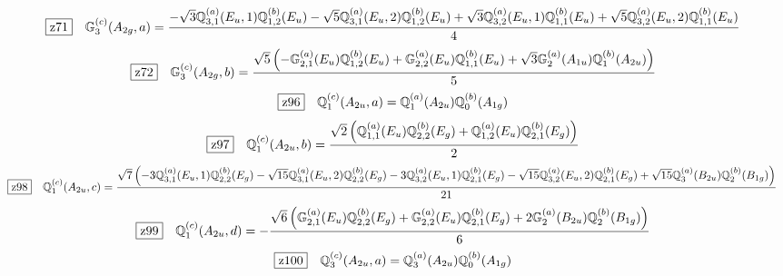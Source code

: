 \documentclass[fleqn,10pt,landscape]{jsarticle}
\begin{document}
\begin{dmath*}
\hspace*{3mm}\fbox{z71}\quad \mathbb{G}_{3}^{(c)}(A_{2g},a)=\frac{- \sqrt{3} \mathbb{Q}_{3,1}^{(a)}(E_{u},1) \mathbb{Q}_{1,2}^{(b)}(E_{u}) - \sqrt{5} \mathbb{Q}_{3,1}^{(a)}(E_{u},2) \mathbb{Q}_{1,2}^{(b)}(E_{u}) + \sqrt{3} \mathbb{Q}_{3,2}^{(a)}(E_{u},1) \mathbb{Q}_{1,1}^{(b)}(E_{u}) + \sqrt{5} \mathbb{Q}_{3,2}^{(a)}(E_{u},2) \mathbb{Q}_{1,1}^{(b)}(E_{u})}{4}
\end{dmath*}
\begin{dmath*}
\hspace*{3mm}\fbox{z72}\quad \mathbb{G}_{3}^{(c)}(A_{2g},b)=\frac{\sqrt{5} \left(- \mathbb{G}_{2,1}^{(a)}(E_{u}) \mathbb{Q}_{1,2}^{(b)}(E_{u}) + \mathbb{G}_{2,2}^{(a)}(E_{u}) \mathbb{Q}_{1,1}^{(b)}(E_{u}) + \sqrt{3} \mathbb{G}_{2}^{(a)}(A_{1u}) \mathbb{Q}_{1}^{(b)}(A_{2u})\right)}{5}
\end{dmath*}
\begin{dmath*}
\hspace*{3mm}\fbox{z96}\quad \mathbb{Q}_{1}^{(c)}(A_{2u},a)=\mathbb{Q}_{1}^{(a)}(A_{2u}) \mathbb{Q}_{0}^{(b)}(A_{1g})
\end{dmath*}
\begin{dmath*}
\hspace*{3mm}\fbox{z97}\quad \mathbb{Q}_{1}^{(c)}(A_{2u},b)=\frac{\sqrt{2} \left(\mathbb{Q}_{1,1}^{(a)}(E_{u}) \mathbb{Q}_{2,2}^{(b)}(E_{g}) + \mathbb{Q}_{1,2}^{(a)}(E_{u}) \mathbb{Q}_{2,1}^{(b)}(E_{g})\right)}{2}
\end{dmath*}
\begin{dmath*}
\hspace*{3mm}\fbox{z98}\quad \mathbb{Q}_{1}^{(c)}(A_{2u},c)=\frac{\sqrt{7} \left(- 3 \mathbb{Q}_{3,1}^{(a)}(E_{u},1) \mathbb{Q}_{2,2}^{(b)}(E_{g}) - \sqrt{15} \mathbb{Q}_{3,1}^{(a)}(E_{u},2) \mathbb{Q}_{2,2}^{(b)}(E_{g}) - 3 \mathbb{Q}_{3,2}^{(a)}(E_{u},1) \mathbb{Q}_{2,1}^{(b)}(E_{g}) - \sqrt{15} \mathbb{Q}_{3,2}^{(a)}(E_{u},2) \mathbb{Q}_{2,1}^{(b)}(E_{g}) + \sqrt{15} \mathbb{Q}_{3}^{(a)}(B_{2u}) \mathbb{Q}_{2}^{(b)}(B_{1g})\right)}{21}
\end{dmath*}
\begin{dmath*}
\hspace*{3mm}\fbox{z99}\quad \mathbb{Q}_{1}^{(c)}(A_{2u},d)=- \frac{\sqrt{6} \left(\mathbb{G}_{2,1}^{(a)}(E_{u}) \mathbb{Q}_{2,2}^{(b)}(E_{g}) + \mathbb{G}_{2,2}^{(a)}(E_{u}) \mathbb{Q}_{2,1}^{(b)}(E_{g}) + 2 \mathbb{G}_{2}^{(a)}(B_{2u}) \mathbb{Q}_{2}^{(b)}(B_{1g})\right)}{6}
\end{dmath*}
\begin{dmath*}
\hspace*{3mm}\fbox{z100}\quad \mathbb{Q}_{3}^{(c)}(A_{2u},a)=\mathbb{Q}_{3}^{(a)}(A_{2u}) \mathbb{Q}_{0}^{(b)}(A_{1g})
\end{dmath*}
\end{document}

